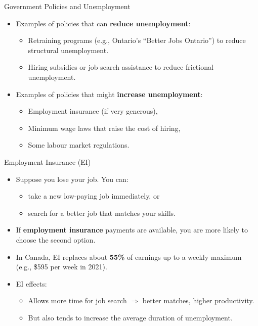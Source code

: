 \documentclass[aspectratio=169]{beamer}
\begin{document}
\begin{frame}{Government Policies and Unemployment}
\transfade
\begin{itemize}
  \item Examples of policies that can \textbf{reduce unemployment}:
  \begin{itemize}
    \item Retraining programs (e.g., Ontario’s “Better Jobs Ontario”) to reduce structural unemployment.
    \item Hiring subsidies or job search assistance to reduce frictional unemployment.
  \end{itemize}
  \item Examples of policies that might \textbf{increase unemployment}:
  \begin{itemize}
    \item Employment insurance (if very generous),
    \item Minimum wage laws that raise the cost of hiring,
    \item Some labour market regulations.
  \end{itemize}
\end{itemize}
\end{frame}

\begin{frame}{Employment Insurance (EI)}
\transfade
\begin{itemize}
  \item Suppose you lose your job. You can:
  \begin{itemize}
    \item take a new low-paying job immediately, or
    \item search for a better job that matches your skills.
  \end{itemize}
  \item If \textbf{employment insurance} payments are available, you are more likely to choose the second option.
  \item In Canada, EI replaces about \textbf{55\%} of earnings up to a weekly maximum (e.g., \$595 per week in 2021).
  \item EI effects:
  \begin{itemize}
    \item Allows more time for job search \(\Rightarrow\) better matches, higher productivity.
    \item But also tends to \alert{increase} the average duration of unemployment.
  \end{itemize}
\end{itemize}
\end{frame}
\end{document}

